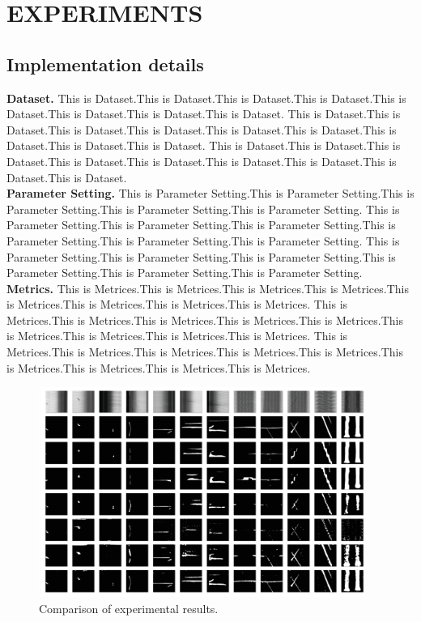 \documentclass{article}
\begin{document}
\section{EXPERIMENTS}
\label{sec:pagestyle}
\subsection{Implementation details}
\label{Implementation details}
{\bf Dataset.} This is Dataset.This is Dataset.This is Dataset.This is Dataset.This is Dataset.This is Dataset.This is Dataset.This is Dataset.
This is Dataset.This is Dataset.This is Dataset.This is Dataset.This is Dataset.This is Dataset.This is Dataset.This is Dataset.This is Dataset.
This is Dataset.This is Dataset.This is Dataset.This is Dataset.This is Dataset.This is Dataset.This is Dataset.This is Dataset.This is Dataset.\\
{\bf Parameter Setting.} This is Parameter Setting.This is Parameter Setting.This is Parameter Setting.This is Parameter Setting.This is Parameter Setting.
This is Parameter Setting.This is Parameter Setting.This is Parameter Setting.This is Parameter Setting.This is Parameter Setting.This is Parameter Setting.
This is Parameter Setting.This is Parameter Setting.This is Parameter Setting.This is Parameter Setting.This is Parameter Setting.This is Parameter Setting.\\
{\bf Metrics.} This is Metrices.This is Metrices.This is Metrices.This is Metrices.This is Metrices.This is Metrices.This is Metrices.This is Metrices.
This is Metrices.This is Metrices.This is Metrices.This is Metrices.This is Metrices.This is Metrices.This is Metrices.This is Metrices.This is Metrices.
This is Metrices.This is Metrices.This is Metrices.This is Metrices.This is Metrices.This is Metrices.This is Metrices.This is Metrices.This is Metrices.


\begin{figure}[t]
  \centering
  \centerline{\includegraphics[width=0.95\textwidth]{pic3.eps}}
  \caption{Comparison of experimental results.}
\end{figure}
\end{document}
